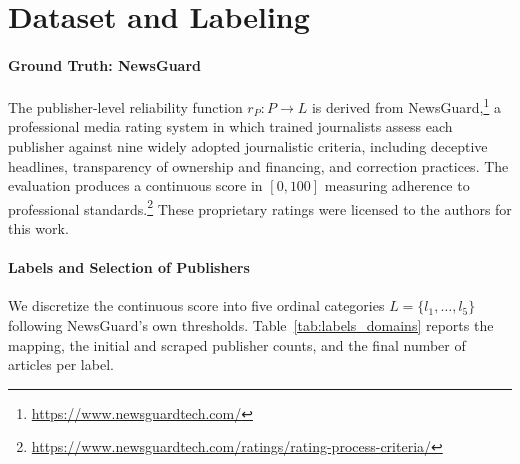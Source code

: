 \documentclass[runningheads]{llncs}
\begin{document}
\section{Dataset and Labeling}
\label{sec:dataset}

\paragraph{Ground Truth: NewsGuard}
\label{sec:newsguard}

The publisher-level reliability function \(r_P : P \rightarrow L\) is derived from NewsGuard,\footnote{\url{https://www.newsguardtech.com/}} a professional media rating system in which trained journalists assess each publisher against nine widely adopted journalistic criteria, including deceptive headlines, transparency of ownership and financing, and correction practices. The evaluation produces a continuous score in \([0,100]\) measuring adherence to professional standards.\footnote{\url{https://www.newsguardtech.com/ratings/rating-process-criteria/}} These proprietary ratings were licensed to the authors for this work.

\paragraph{Labels and Selection of Publishers}
\label{sec:labelConstruction}

We discretize the continuous score into five ordinal categories \(L = \{l_1, \dots, l_5\}\) following NewsGuard's own thresholds. Table~\ref{tab:labels_domains} reports the mapping, the initial and scraped publisher counts, and the final number of articles per label.

\begin{table}[ht]
\centering
{}
\caption{Reliability labels and NewsGuard score ranges, with the number of domains after filtering, successfully scraped domains, and collected articles.}
\label{tab:labels_domains}
\end{table}
\end{document}
